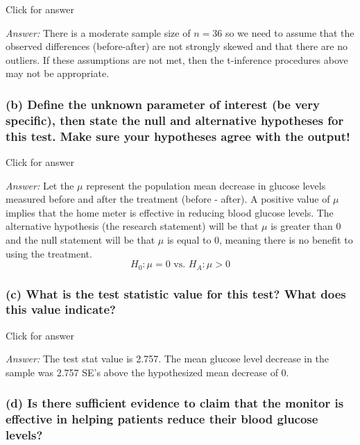 \documentclass[
]{book}
\begin{document}
Click for answer

\emph{Answer:} There is a moderate sample size of \(n=36\) so we need to assume that the observed differences (before-after) are not strongly skewed and that there are no outliers. If these assumptions are not met, then the t-inference procedures above may not be appropriate.

\hypertarget{b-define-the-unknown-parameter-of-interest-be-very-specific-then-state-the-null-and-alternative-hypotheses-for-this-test.-make-sure-your-hypotheses-agree-with-the-output}{%
\subsubsection{(b) Define the unknown parameter of interest (be very specific), then state the null and alternative hypotheses for this test. Make sure your hypotheses agree with the output!}\label{b-define-the-unknown-parameter-of-interest-be-very-specific-then-state-the-null-and-alternative-hypotheses-for-this-test.-make-sure-your-hypotheses-agree-with-the-output}}

Click for answer

\emph{Answer:} Let the \(\mu\) represent the population mean decrease in glucose levels measured before and after the treatment (before - after). A positive value of \(\mu\) implies that the home meter is effective in reducing blood glucose levels. The alternative hypothesis (the research statement) will be that \(\mu\) is greater than 0 and the null statement will be that \(\mu\) is equal to 0, meaning there is no benefit to using the treatment.
\[
H_0:  \mu = 0 \textrm{ vs. } H_A: \mu > 0
\]

\hypertarget{c-what-is-the-test-statistic-value-for-this-test-what-does-this-value-indicate}{%
\subsubsection{(c) What is the test statistic value for this test? What does this value indicate?}\label{c-what-is-the-test-statistic-value-for-this-test-what-does-this-value-indicate}}

Click for answer

\emph{Answer:} The test stat value is 2.757. The mean glucose level decrease in the sample was 2.757 SE's above the hypothesized mean decrease of 0.

\hypertarget{d-is-there-sufficient-evidence-to-claim-that-the-monitor-is-effective-in-helping-patients-reduce-their-blood-glucose-levels}{%
\subsubsection{(d) Is there sufficient evidence to claim that the monitor is effective in helping patients reduce their blood glucose levels?}\label{d-is-there-sufficient-evidence-to-claim-that-the-monitor-is-effective-in-helping-patients-reduce-their-blood-glucose-levels}}
\end{document}
